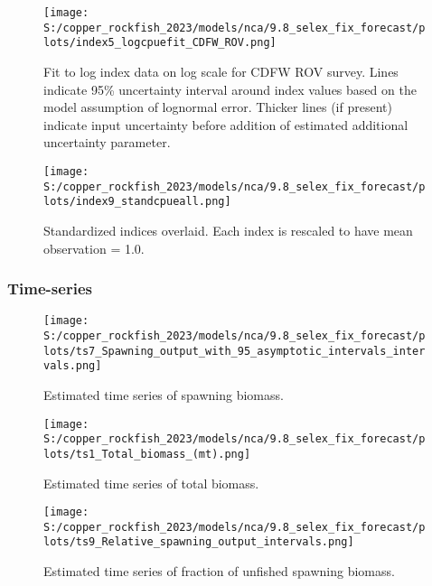 \documentclass[11pt,
  english,
  letterpaper,
]{article}
\begin{document}
\pagebreak

\begin{figure}
\centering
\texttt{[image: S:/copper\_rockfish\_2023/models/nca/9.8\_selex\_fix\_forecast/plots/index5\_logcpuefit\_CDFW\_ROV.png]}
\caption{Fit to log index data on log scale for CDFW ROV survey. Lines indicate 95\% uncertainty interval around index values based on the model assumption of lognormal error. Thicker lines (if present) indicate input uncertainty before addition of estimated additional uncertainty parameter.\label{fig:rov-index-fit}}
\end{figure}

\pagebreak

\begin{figure}
\centering
\texttt{[image: S:/copper\_rockfish\_2023/models/nca/9.8\_selex\_fix\_forecast/plots/index9\_standcpueall.png]}
\caption{Standardized indices overlaid. Each index is rescaled to have mean observation = 1.0.\label{fig:standardized-indices}}
\end{figure}

\pagebreak

\hypertarget{time-series}{%
\subsubsection{Time-series}\label{time-series}}

\begin{figure}
\centering
\texttt{[image: S:/copper\_rockfish\_2023/models/nca/9.8\_selex\_fix\_forecast/plots/ts7\_Spawning\_output\_with\_95\_asymptotic\_intervals\_intervals.png]}
\caption{Estimated time series of spawning biomass.\label{fig:ssb}}
\end{figure}

\pagebreak

\begin{figure}
\centering
\texttt{[image: S:/copper\_rockfish\_2023/models/nca/9.8\_selex\_fix\_forecast/plots/ts1\_Total\_biomass\_(mt).png]}
\caption{Estimated time series of total biomass.\label{fig:tot-bio}}
\end{figure}

\pagebreak

\begin{figure}
\centering
\texttt{[image: S:/copper\_rockfish\_2023/models/nca/9.8\_selex\_fix\_forecast/plots/ts9\_Relative\_spawning\_output\_intervals.png]}
\caption{Estimated time series of fraction of unfished spawning biomass.\label{fig:depl}}
\end{figure}
\end{document}
